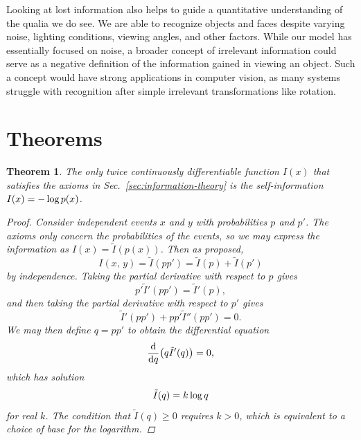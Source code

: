 \documentclass[aps,reprint]{revtex4-2}
\renewcommand\mathrm\textnormal%
\theoremstyle{plain}
\newtheorem{thm}{Theorem}[section]
\theoremstyle{definition}
\renewcommand\log{\operatorname{\mathrm{log}}}
\begin{document}
Looking at lost information also helps to guide a quantitative understanding of
the qualia we do see. We are able to recognize objects and faces despite varying
noise, lighting conditions, viewing angles, and other factors. While our model
has essentially focused on noise, a broader concept of irrelevant information
could serve as a negative definition of the information gained in viewing an
object. Such a concept would have strong applications in computer vision, as
many systems struggle with recognition after simple irrelevant transformations
like rotation.

\appendix

\section{Theorems}

\begin{thm}\label{thm:self-information}
  The only twice continuously differentiable function $I(x)$ that satisfies the
  axioms in Sec.~\ref{sec:information-theory} is the self-information $I(x) =
  -\log p(x)$.
  \begin{proof}
    Consider independent events $x$ and $y$ with probabilities $p$ and $p'$. The
    axioms only concern the probabilities of the events, so we may express the
    information as $I(x) = \tilde{I}(p(x))$. Then as proposed,
    \[
      I(x,\, y)
      = \tilde{I}(pp')
      = \tilde{I}(p) + \tilde{I}(p')
    \]
    by independence. Taking the partial derivative with respect to $p$ gives
    \[
      p' \tilde{I}'(pp')
      = \tilde{I}'(p),
    \]
    and then taking the partial derivative with respect to $p'$ gives
    \[
      \tilde{I}'(pp') + pp' \tilde{I}''(pp')
      = 0.
    \]
    We may then define $q = pp'$ to obtain the differential equation
    \[
      \dv{q}\qty(q \tilde{I}'(q))
      = 0,
    \]
    which has solution
    \[
      \tilde{I}(q) = k\log q
    \]
    for real $k$. The condition that $\tilde{I}(q) \ge 0$ requires $k > 0$,
    which is equivalent to a choice of base for the logarithm.
  \end{proof}
\end{thm}
\end{document}
